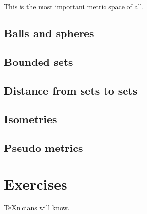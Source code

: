 \begin{example}\label{example:the-real-line}
  This is the most important metric space of all.
\end{example}


\subsection{Balls and spheres}

\subsection{Bounded sets}

\subsection{Distance from sets to sets}

\subsection{Isometries}

\subsection{Pseudo metrics}

\section{Exercises}

\begin{exercise}
  \TeX{}nicians will know.
\end{exercise}
